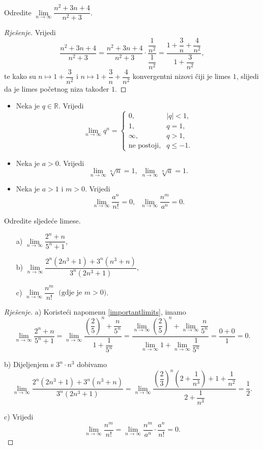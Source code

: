 \begin{exercise}
Odredite $\lim\limits_{n\to \infty}{\dfrac{n^2+3n+4}{n^2+3}}$.
\end{exercise}
\begin{proof}[Rješenje]
Vrijedi
$$\dfrac{n^2+3n+4}{n^2+3}=\dfrac{n^2+3n+4}{n^2+3}\cdot \dfrac{\dfrac{1}{n^2}}{\dfrac{1}{n^2}}=\dfrac{1+\dfrac{3}{n}+\dfrac{4}{n^2}}{1+\dfrac{3}{n^2}},$$
te kako su $n\mapsto 1+\dfrac{3}{n^2}$ i $n\mapsto 1+\dfrac{3}{n}+\dfrac{4}{n^2}$ konvergentni nizovi čiji je limes $1$, slijedi da je limes početnog niza također $1$.
\end{proof}
\begin{remark} \textbf{}
\label{importantlimits}
\begin{itemize}
\item Neka je $q\in \mathbb{R}$. Vrijedi
$$\lim\limits_{n\to \infty}{q^n}=\begin{cases}
0, & |q|<1,\\
1, & q=1,\\
\infty, & q>1,\\
\text{ne postoji}, & q\leq -1.
\end{cases}$$
\item Neka je $a>0$. Vrijedi
$$\lim\limits_{n\to \infty}{\sqrt[n]{n}}=1,\;\lim\limits_{n\to \infty}{\sqrt[n]{a}}=1.$$
\item Neka je $a>1$ i $m>0$. Vrijedi
$$\lim\limits_{n\to \infty}{\dfrac{a^n}{n!}}=0,\;\; \lim\limits_{n\to \infty}{\dfrac{n^m}{a^n}}=0.$$
\end{itemize}
\end{remark}
\begin{exercise} Odredite sljedeće limese.
\begin{itemize}
\item[a)] $\lim\limits_{n\to \infty}{\dfrac{2^n+n}{5^n+1}}$,
\item[b)] $\lim\limits_{n\to \infty}{\dfrac{2^n(2n^3+1)+3^n(n^3+n)}{3^n(2n^3+1)}}$,
\item[c)] $\lim\limits_{n\to \infty}{\dfrac{n^m}{n!}}\;\text{ (gdje je } m>0\text{)}$.
\end{itemize}
\end{exercise}
\begin{proof}[Rješenje]
a) Koristeći napomenu \ref{importantlimits}, imamo
$$\lim\limits_{n\to \infty}{\dfrac{2^n+n}{5^n+1}}=\lim\limits_{n\to \infty}{\dfrac{\left(\dfrac{2}{5}\right)^n+\dfrac{n}{5^n}}{1+\dfrac{1}{5^n}}}=\dfrac{\lim\limits_{n\to \infty}{\left(\dfrac{2}{5}\right)^n}+\lim\limits_{n\to \infty}{\dfrac{n}{5^n}}}{\lim\limits_{n\to \infty}{1}+\lim\limits_{n\to \infty}{\dfrac{1}{5^n}}}=\dfrac{0+0}{1}=0.$$

b) Dijeljenjem s $3^n\cdot n^3$ dobivamo
$$\lim\limits_{n\to \infty}{\dfrac{2^n(2n^3+1)+3^n(n^3+n)}{3^n(2n^3+1)}}=\lim\limits_{n\to \infty}{\dfrac{\left(\dfrac{2}{3}\right)^n\left(2 + \dfrac{1}{n^{3}}\right)+1 + \dfrac{1}{n^{2}}}{2 + \dfrac{1}{n^{3}}}}=\dfrac{1}{2}.$$

c) Vrijedi
$$\lim\limits_{n\to \infty}{\dfrac{n^m}{n!}}=\lim\limits_{n\to \infty}{\dfrac{n^m}{a^n}\cdot \dfrac{a^n}{n!}}=0.$$
\end{proof}
